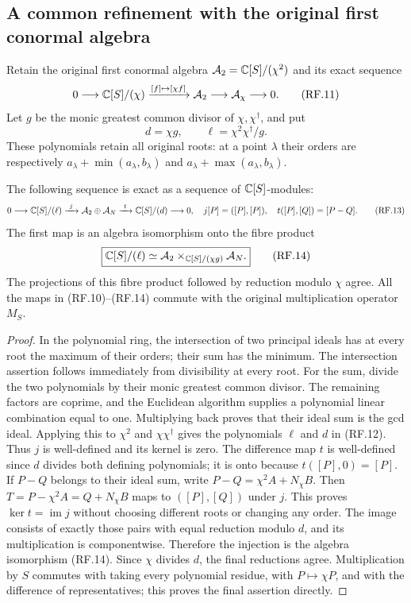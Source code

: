 \subsection{A common refinement with the original first conormal algebra}

Retain the original first conormal algebra
$\mathcal A_2=\mathbb C[S]/(\chi^2)$ and its exact sequence
\[
 0\longrightarrow\mathbb C[S]/(\chi)
 \xrightarrow{[f]\mapsto[\chi f]}\mathcal A_2
 \longrightarrow\mathcal A_\chi\longrightarrow0.
 \tag{RF.11}
\]
Let $g$ be the monic greatest common divisor of $\chi,\chi^\dagger$,
and put
\[
 d=\chi g,\qquad
 \ell=\chi^2\chi^\dagger/g.
 \tag{RF.12}
\]
These polynomials retain all original roots: at a point $\lambda$
their orders are respectively
$a_\lambda+\min(a_\lambda,b_\lambda)$ and
$a_\lambda+\max(a_\lambda,b_\lambda)$.

\begin{theorem}
The following sequence is exact as a sequence of $\mathbb C[S]$-modules:
\[
 0\longrightarrow\mathbb C[S]/(\ell)
 \xrightarrow{\ j\ }\mathcal A_2\oplus\mathcal A_N
 \xrightarrow{\ t\ }\mathbb C[S]/(d)\longrightarrow0,
 \quad
 j[P]=([P],[P]),\quad t([P],[Q])=[P-Q].
 \tag{RF.13}
\]
The first map is an algebra isomorphism onto the fibre product
\[
 \boxed{\mathbb C[S]/(\ell)\simeq
       \mathcal A_2\mathbin{\times}_{\mathbb C[S]/(\chi g)}\mathcal A_N.}
 \tag{RF.14}
\]
The projections of this fibre product followed by reduction modulo
$\chi$ agree. All the maps in (RF.10)--(RF.14) commute with the
original multiplication operator $M_S$.
\end{theorem}

\begin{proof}
In the polynomial ring, the intersection of two principal ideals
has at every root the maximum of their orders; their sum has the
minimum. The intersection assertion follows immediately from
divisibility at every root. For the sum, divide the two polynomials
by their monic greatest common divisor. The remaining factors are
coprime, and the Euclidean algorithm supplies a polynomial linear
combination equal to one. Multiplying back proves that their ideal
sum is the gcd ideal. Applying this to $\chi^2$ and $\chi\chi^\dagger$
gives the polynomials $\ell$ and $d$ in (RF.12).
Thus $j$ is well-defined and its kernel is zero. The difference
map $t$ is well-defined since $d$ divides both defining polynomials;
it is onto because $t([P],0)=[P]$.
If $P-Q$ belongs to their ideal sum, write
$P-Q=\chi^2 A+N_\chi B$. Then
$T=P-\chi^2 A=Q+N_\chi B$ maps to $([P],[Q])$ under $j$.
This proves $\ker t=\operatorname{im}j$ without choosing different
roots or changing any order. The image consists of exactly those
pairs with equal reduction modulo $d$, and its multiplication is
componentwise. Therefore the injection is the algebra isomorphism
(RF.14). Since $\chi$ divides $d$, the final reductions agree.
Multiplication by $S$ commutes with taking every polynomial residue,
with $P\mapsto\chi P$, and with the difference of representatives;
this proves the final assertion directly.
\end{proof}

